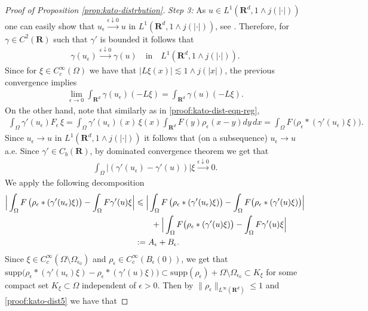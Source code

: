 \documentclass[a4paper,12pt,draft]{article}
\theoremstyle{plain}
\theoremstyle{definition}
\numberwithin{equation}{section}
\newcommand{\rd}{\mathbf{R}^d}
\newcommand\R{\mathbf{R}}
\renewcommand{\leq}{\leqslant}
\newcommand{\1}{1}
\begin{document}
\begin{proof}[Proof of Proposition \ref{prop:kato-distrbution}]
\textit{Step 3:} As $u \in L^1(\rd, 1\wedge j(|\cdot|))$ one can easily show that $u_\epsilon \xrightarrow{\epsilon\downarrow 0} u$ in $L^1(\rd, 1\wedge j(|\cdot|))$, see \cite[Lemma 2.9]{GKL}. Therefore, for $\gamma \in C^2(\R)$ such that $\gamma'$ is bounded it follows that 
\begin{align*}
    \gamma(u_\epsilon) \xrightarrow{\epsilon\downarrow 0} \gamma(u) \quad \text{in} \quad  L^1(\rd, 1\wedge j(|\cdot|)).  
\end{align*}
Since for $\xi \in C^{\infty}_c(\Omega)$ we have that $|L\xi(x)| \lesssim 1\wedge j(|x|) $, the previous convergence implies 
\begin{align}\label{eq:lhs}
    \lim_{\epsilon\rightarrow 0} \int_{\rd} \gamma(u_\epsilon) (-L\xi) = \int_{\rd} \gamma(u) (-L\xi).
\end{align}
On the other hand, note that similarly as in \eqref{proof:kato-dist-eqn-reg},
\begin{align}\label{eq:rhs}
    \int_{\Omega} \gamma'(u_\epsilon) F_\epsilon \, \xi = \int_{\Omega} \gamma'(u_\epsilon)(x)  \, \xi(x) \int_{\rd} F(y) \rho_\epsilon(x-y) dy \, dx = \int_{\Omega} F\,  \big( \rho_\epsilon * (\gamma'(u_\epsilon)\xi)\big).
\end{align}
Since $u_\epsilon \rightarrow u$ in $L^1(\rd, 1\wedge j(|\cdot|))$ it follows that (on a subsequence) $u_\epsilon \longrightarrow u$ a.e. Since $\gamma'\in C_b(\R)$, by dominated convergence theorem we get that 
\begin{align}\label{proof:kato-dist5}
    \int_{\Omega} \big| (\gamma'(u_\epsilon) - \gamma'(u))\big|  \xi   \xrightarrow{\epsilon\downarrow0} 0. 
\end{align}
We apply the following decomposition 
\begin{align}\label{proof:kato-dist6}
    \Big|\int_{\Omega}F\,  \big( \rho_\epsilon * (\gamma'(u_\epsilon)\xi)\big) - \int_{\Omega} F \gamma'(u)\xi \Big| & \leq \Big| \int_{\Omega}F\,  \big( \rho_\epsilon * (\gamma'(u_\epsilon)\xi)\big) - \int_{\Omega} F \big( \rho_\epsilon * (\gamma'(u)\xi)\big)\Big|  \notag \\
    & \qquad + \Big|  \int_{\Omega} F \big( \rho_\epsilon * (\gamma'(u)\xi)\big) - \int_{\Omega} F \gamma'(u)\xi \Big|  \notag \\
    & := A_\epsilon + B_\epsilon. 
\end{align}
Since $\xi \in C^{\infty}_c (\Omega\setminus\Omega_{\epsilon_0})$ and $\rho_\epsilon \in C^{\infty}_c(B_\epsilon(0))$, we get that $\text{supp}\Big(\rho_\epsilon * (\gamma'(u_\epsilon)\xi) - \rho_\epsilon * (\gamma'(u)\xi) \Big) \subset \text{supp}(\rho_\epsilon) + \Omega\setminus\Omega_{\epsilon_0} \subset K_{\xi}$ for some compact set $K_{\xi}\subset \Omega$ independent of $\epsilon>0$. Then by $\|\rho_\epsilon\|_{L^{\infty}(\rd)}\leq 1$ and \eqref{proof:kato-dist5} we have that

\end{proof}
\end{document}
